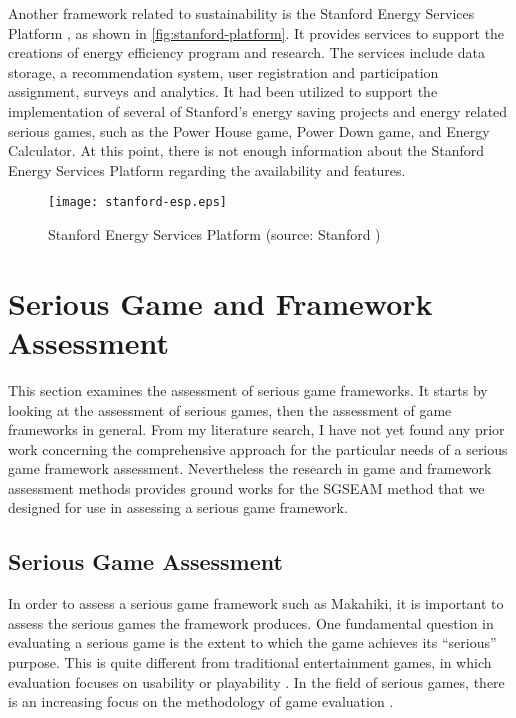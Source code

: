 Another framework related to sustainability is the Stanford Energy Services Platform \cite{Armel-2012}, as shown in \autoref{fig:stanford-platform}. It provides services to support the creations of energy efficiency program and research. The services include data storage, a recommendation system, user registration and participation assignment, surveys and analytics. It had been utilized to support the implementation of several of Stanford's energy saving projects and energy related serious games, such as the Power House game, Power Down game, and Energy Calculator. At this point, there is not enough information about the Stanford Energy Services Platform regarding the availability and features. 

\begin{figure}[ht!]
	\centering
		\texttt{[image: stanford-esp.eps]}
		\caption{Stanford Energy Services Platform (source: Stanford \cite{Armel-2012})}
		\label{fig:stanford-platform}
\end{figure}
 
\section{Serious Game and Framework Assessment}
\label{sec:rel-sg-assessment}

This section examines the assessment of serious game frameworks. It starts by looking at the assessment of serious games, then  the assessment of game frameworks in general. From my literature search, I have not yet found any prior work concerning the comprehensive approach for the particular needs of a serious game framework assessment. Nevertheless the research in game and framework assessment methods provides ground works for the SGSEAM method that we designed for use in assessing a serious game framework.

\subsection{Serious Game Assessment}

In order to assess a serious game framework such as Makahiki, it is important to assess the serious games the framework produces.  One fundamental question in evaluating a serious game is the extent to which the
game achieves its ``serious'' purpose.  This is quite different from traditional entertainment games, in which evaluation focuses on usability or playability \cite{song2007new}. In the field of serious games, there is an increasing focus on the methodology of game evaluation \cite{Mayer2012233}. 

